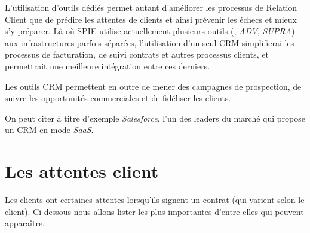         L'utilisation d'outils dédiés permet autant d'améliorer les processus de Relation Client que de prédire les attentes de clients et ainsi prévenir les échecs et mieux s'y préparer. Là où SPIE utilise actuellement plusieurs outils (, \textit{ADV}, \textit{SUPRA}) aux infrastructures parfois séparées, l'utilisation d'un seul CRM simplifierai les processus de facturation, de suivi contrats et autres processus clients, et permettrait une meilleure intégration entre ces derniers.

        Les outils CRM permettent en outre de mener des campagnes de prospection, de suivre les opportunités commerciales et de fidéliser les clients.

        On peut citer à titre d'exemple \textit{Salesforce}, l'un des leaders du marché qui propose un CRM en mode \textit{SaaS}.




\section{Les attentes client}

	Les clients ont certaines attentes lorsqu'ils signent un contrat (qui varient selon le client). Ci dessous nous allons lister les plus importantes d'entre elles qui peuvent apparaître.

